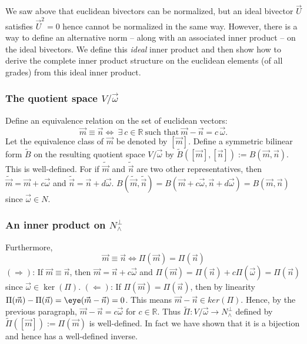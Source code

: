 \documentclass{birkjour}
\newcommand{\vsp}{V\xspace}
\begin{document}
We saw above that euclidean bivectors can be normalized, but an ideal bivector $\vec{U}$ satisfies $\vec{U}^{2}=0$ hence cannot be normalized in the same way.  However, there is a way to define an alternative norm -- along with an associated inner product -- on the ideal bivectors.  We define this \emph{ideal} inner product and then  show how to derive the  complete inner product structure on the euclidean elements (of all grades) from this ideal inner product.  %

\subsubsection{The quotient space $\vsp/\vec{\omega}$}
Define an equivalence relation on the set of  euclidean vectors: \[\vec{m} \equiv \vec{n} \iff~\exists~ c \in \mathbb{R}~\text{such that}~\vec{m} - \vec{n} = c\,\vec{\omega}.\]  Let the equivalence class of $\vec{m}$ be denoted by $[\vec{m}]$.   Define a symmetric bilinear form $\widetilde{B}$ on the resulting quotient space $\vsp/\vec{\omega}$ by $\widetilde{B}( [\vec{m}], [\vec{n}]) := B( \vec{m}, \vec{n})$.  This is well-defined.  For if $\widetilde{\vec{m}}$ and $\widetilde{\vec{n}}$ are two other representatives, then $\widetilde{\vec{m}} = \vec{m} + c\vec{\omega}$ and  $\widetilde{\vec{n}} = \vec{n} + d\vec{\omega}$.  $B(\widetilde{ \vec{m}}, \widetilde{\vec{n}}) = B(\vec{m} + c\vec{\omega}, \vec{n} + d\vec{\omega}) = B(\vec{m}, \vec{n})$ since $\vec{\omega} \in N$.  

\subsubsection{An  inner product on $N^{\perp}_{\wedge}$}

Furthermore,  \[\vec{m} \equiv \vec{n} \iff \Pi(\vec{m}) = \Pi(\vec{n})\] $(\Rightarrow)$: If $\vec{m} \equiv \vec{n}$,  then $\vec{m} = \vec{n} + c\vec{\omega}$ and $\Pi(\vec{m}) = \Pi(\vec{n}) + c\Pi(\vec{\omega}) = \Pi(\vec{n})$ since $\vec{\omega} \in \ker(\Pi)$.  $(\Leftarrow)$: If $\Pi(\vec{m}) = \Pi(\vec{n})$, then by linearity $\Pi(\vec{m}) -\Pi(\vec{n}) = \eye(\vec{m} - \vec{n}) =  0$.  This means $\vec{m} - \vec{n} \in ker(\Pi)$.  Hence, by the  previous paragraph, $\vec{m} - \vec{n} = c\vec{\omega}$ for $c \in \mathbb{R}$. Thus $\widetilde{\Pi} : \vsp/\vec{\omega} \rightarrow N_{\wedge}^{\perp}$ defined by $\widetilde{\Pi}([\vec{m}]) := \Pi(\vec{m})$ is well-defined.  In fact we have shown that it is a bijection and hence has a well-defined inverse.
\end{document}
